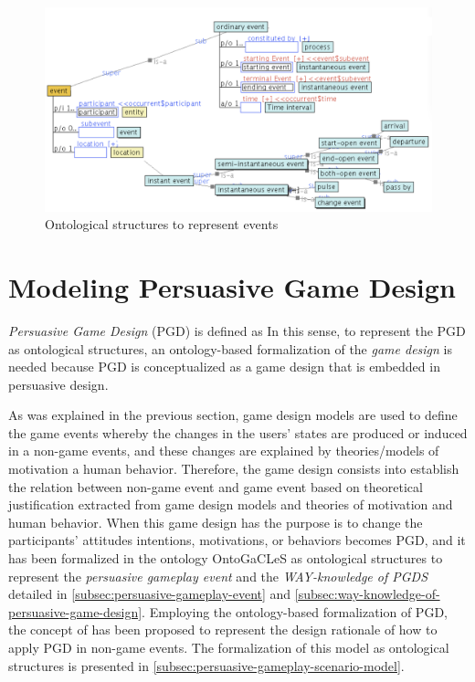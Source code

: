 \begin{figure}[!htb]
 \caption{Ontological structures to represent events}
 \label{fig:ontological-structures-event}
 \centering
 \includegraphics[width=1\textwidth]{images/chap-ontogacles2/ontological-structures-event.png}
 \fautor
\end{figure}

\section[Modeling Persuasive Game Design]{Modeling Persuasive Game Design}
\label{sec:modeling-persuasive-game-design}

\emph{Persuasive Game Design} (PGD) is defined as 
In this sense, to represent the PGD as ontological structures, an ontology-based formalization of the \emph{game design} is needed because PGD is conceptualized as a game design that is embedded in persuasive design.

As was explained in the previous section, game design models are used to define the game events whereby the changes in the users’ states are produced or induced in a non-game events, and these changes are explained by theories/models of motivation a human behavior.
Therefore, the game design consists into establish the relation between non-game event and game event based on theoretical justification extracted from game design models and theories of motivation and human behavior.
When this game design has the purpose is to change the participants' attitudes intentions, motivations, or behaviors becomes PGD, and it has been formalized in the ontology OntoGaCLeS as ontological structures to represent the \emph{persuasive gameplay event} and the \emph{WAY-knowledge of PGDS} detailed in \autoref{subsec:persuasive-gameplay-event} and \autoref{subsec:way-knowledge-of-persuasive-game-design}.
Employing the ontology-based formalization of PGD, the concept of  has been proposed to represent the design rationale of how to apply PGD in non-game events.
The formalization of this model as ontological structures is presented in \autoref{subsec:persuasive-gameplay-scenario-model}.

